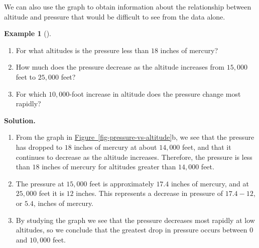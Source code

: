 \documentclass[10pt,]{book}
\theoremstyle{plain}
\theoremstyle{definition}
\theoremstyle{definition}
\newtheorem{example}[theorem]{Example}
\theoremstyle{definition}
\numberwithin{equation}{part}
\begin{document}
\par
We can also use the graph to obtain information about the relationship between altitude and pressure that would be difficult to see from the data alone.%
\begin{example}[]\label{example-27}
\leavevmode%
\begin{enumerate}[label=*\alph**]
\item\hypertarget{li-163}{}For what altitudes is the pressure less than \(18\) inches of mercury?%
\item\hypertarget{li-164}{}How much does the pressure decrease as the altitude increases from \(15,000\) feet to \(25,000\) feet?%
\item\hypertarget{li-165}{}For which \(10,000\)-foot increase in altitude does the pressure change most rapidly?%
\end{enumerate}
%
\par\medskip\noindent%
\textbf{Solution.}\quad \leavevmode%
\begin{enumerate}[label=*\alph**]
\item\hypertarget{li-166}{}From the graph in \hyperref[fig-pressure-vs-altitude]{Figure~\ref{fig-pressure-vs-altitude}}b, we see that the pressure has dropped to \(18\) inches of mercury at about \(14,000\) feet, and that it continues to decrease as the altitude increases. Therefore, the pressure is less than \(18\) inches of mercury for altitudes greater than \(14,000\) feet.%
\item\hypertarget{li-167}{}The pressure at \(15,000\) feet is approximately \(17.4\) inches of mercury, and at \(25,000\) feet it is \(12\) inches. This represents a decrease in pressure of \(17.4 − 12\), or \(5.4\), inches of mercury.%
\item\hypertarget{li-168}{}By studying the graph we see that the pressure decreases most rapidly at low altitudes, so we conclude that the greatest drop in pressure occurs between \(0\) and \(10,000\) feet.%
\end{enumerate}
%
\end{example}
\typeout{************************************************}
\typeout{************************************************}
\end{document}
